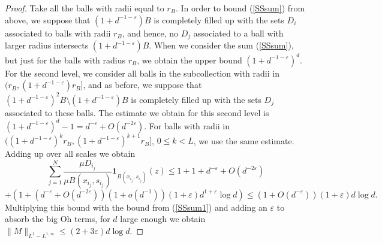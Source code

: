 \documentclass[12pt]{amsart}
\theoremstyle{definition}
\theoremstyle{parrafo}
\begin{document}
\begin{proof}
Take  all the  balls with radii equal to  $r_B$. 
In order to bound (\ref{SSsum}) from above, we suppose that $(1 + d^{ - 1 -  \varepsilon})  B$
is completely filled up with the sets $D_i$ associated to balls with radii $r_B$, and hence,
no $D_j$ associated to a ball with larger radius intersects $(1 + d^{  -1  -  \varepsilon})  B$.
When we consider the sum (\ref{SSsum}), but just for the balls with radius $r_B$,  we obtain
the upper bound $(1 + d^{ - 1 -  \varepsilon})^d$. For the second level, we consider all balls in the
subcollection   with radii in $(r_B, (1 + d^{ - 1 -  \varepsilon}) r_B]$, and
as before, we suppose that $(1 + d^{ - 1 -  \varepsilon})^2 B \setminus (1 + d^{ - 1 -  \varepsilon})  B$
is completely filled up with the sets $D_j$ associated to these balls. The estimate we obtain
for this second level is $(1 + d^{ - 1 -  \varepsilon})^d  - 1 =  d^{ - \varepsilon}
 + O(d^{ -2  \varepsilon})$. For balls with radii in $((1 + d^{ - 1 -  \varepsilon})^k  r_B, 
 (1 + d^{ - 1 -  \varepsilon})^{k + 1} r_B]$, $0 \le k < L$, we use the same estimate.
 Adding up over all scales we obtain
 $$
 \sum_{j=1}^N \frac{\mu D_{i_j}}{\mu B(x_{i_j}, s_{i_j})}\mathbf{1}_{B(x_{i_j}, s_{i_j})}(z) 
 \le
 1 + 1 + d^{ - \varepsilon}
 + O(d^{ -2  \varepsilon})
 $$
 $$
  + (1 +  (d^{ - \varepsilon}
 + O(d^{ -2  \varepsilon})) (1 + o(d^{-1}))(1 + \varepsilon) d^{1 + \varepsilon} \log d)
 \le  (1 + O(d^{-\varepsilon}))(1 + \varepsilon) d \log d.
 $$
 Multiplying this bound with the bound from (\ref{SSsum1})
 and adding an $\varepsilon$ to absorb the big Oh terms, 
 for $d$ large enough we obtain 
$\|M\|_{L^1-L^{1,\infty}} \le (2 +  3 \varepsilon) d \log d$.  
  \end{proof} 
\end{document}
